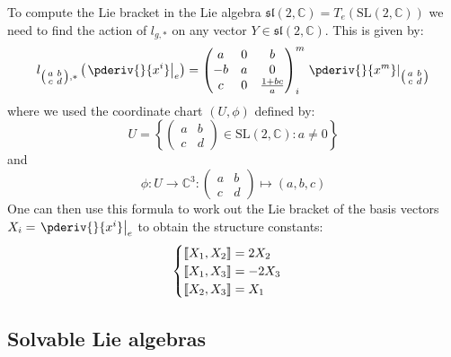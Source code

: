         \begin{example}
        	To compute the Lie bracket in the Lie algebra $\mathfrak{sl}(2, \mathbb{C}) = T_e(\text{SL}(2, \mathbb{C}))$ we need to find the action of $l_{g, *}$ on any vector $Y\in\mathfrak{sl}(2, \mathbb{C})$. This is given by:
        	\begin{gather}
        		l_{\left(\begin{smallmatrix}a&b\\c&d\end{smallmatrix}\right), *}\left(\left.\pderiv{}{x^i}\right|_e\right)
        		= \left(\begin{matrix}a&0&b\\-b&a&0\\c&0&\frac{1+bc}{a}\end{matrix}\right)^m_i\left.\pderiv{}{x^m}\right|_{\left(\begin{smallmatrix}a&b\\c&d\end{smallmatrix}\right)}
        	\end{gather}
        	where we used the coordinate chart $(U, \phi)$ defined by: \[U = \left\{\left(\begin{matrix}a&b\\c&d\end{matrix}\right)\in\text{SL}(2, \mathbb{C}): a\neq0\right\}\] and \[\phi:U\rightarrow\mathbb{C}^3:\left(\begin{matrix}a&b\\c&d\end{matrix}\right)\mapsto(a, b, c)\]
        	One can then use this formula to work out the Lie bracket of the basis vectors $X_i = \left.\pderiv{}{x^i}\right|_e$ to obtain the structure constants:
        	\begin{gather}
        		\label{lie:sl2c_lie_brackets}
        		\begin{cases}
        			\text{\textlbrackdbl}X_1, X_2\text{\textrbrackdbl} = 2X_2\\
        			\text{\textlbrackdbl}X_1, X_3\text{\textrbrackdbl} = -2X_3\\
        			\text{\textlbrackdbl}X_2, X_3\text{\textrbrackdbl} = X_1
        		\end{cases}
        	\end{gather}
        \end{example}

\subsection{Solvable Lie algebras}

